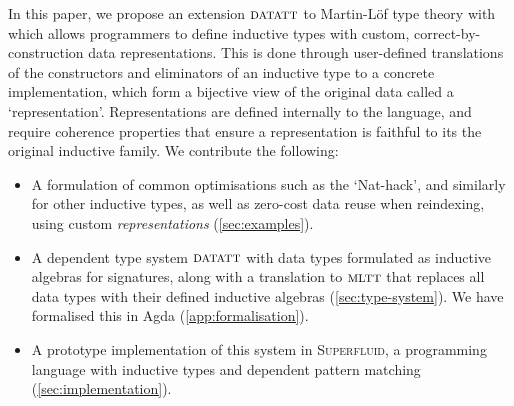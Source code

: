 In this paper, we propose an extension ${\textsc{datatt}}$ to Martin-L\"of type theory \cite{Martin-Lof1984-pz} with
which allows programmers to define inductive types with custom,
correct-by-construction data representations. This is done through user-defined
translations of the constructors and eliminators of an inductive type to a
concrete implementation, which form a bijective view of the original data called
a `representation'. Representations are defined internally to the language, and
require coherence properties that ensure a representation is faithful to its the
original inductive family. We contribute the following:
\begin{itemize}
    \item A formulation of common optimisations such as the `Nat-hack', and
        similarly for other inductive types, as well as zero-cost data reuse when
        reindexing, using custom \emph{representations} (\cref{sec:examples}).
        \item A dependent type system ${\textsc{datatt}}$ with data types formulated
        as inductive algebras for signatures, along with a translation to
        ${\textsc{mltt}}$ that replaces all data types with their defined inductive
        algebras (\cref{sec:type-system}). We have formalised this in Agda (\cref{app:formalisation}).
        \item A prototype implementation of this system in \textsc{Superfluid},
        a programming language with inductive types and dependent pattern
        matching (\cref{sec:implementation}).
\end{itemize}
